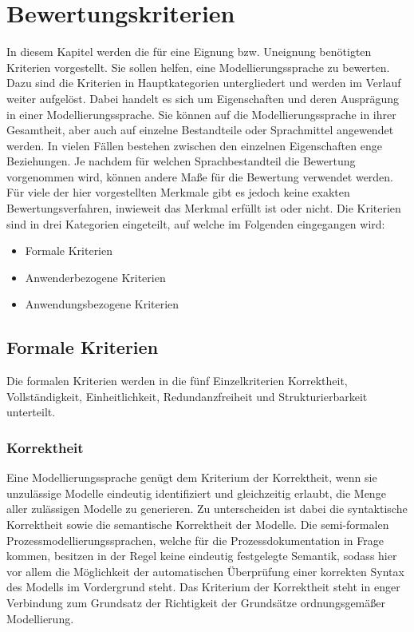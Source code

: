 

\chapter{Bewertungskriterien}
In diesem Kapitel werden die für eine Eignung bzw. Uneignung benötigten Kriterien vorgestellt.
Sie sollen helfen, eine Modellierungssprache zu bewerten. Dazu sind die Kriterien in Hauptkategorien untergliedert und werden im Verlauf weiter aufgelöst. 
Dabei handelt es sich um Eigenschaften und deren Ausprägung in einer Modellierungssprache.
Sie können auf die Modellierungssprache in ihrer Gesamtheit, aber auch auf einzelne Bestandteile oder Sprachmittel angewendet werden.
In vielen Fällen bestehen zwischen den einzelnen Eigenschaften enge Beziehungen.
Je nachdem für welchen Sprachbestandteil die Bewertung vorgenommen wird, können andere Maße für die Bewertung verwendet werden.
Für viele der hier vorgestellten Merkmale gibt es jedoch keine exakten Bewertungsverfahren, inwieweit das Merkmal erfüllt ist oder nicht.
Die Kriterien sind in drei Kategorien eingeteilt, auf welche im Folgenden eingegangen wird:

\begin{itemize}
		\item Formale Kriterien
		\item Anwenderbezogene Kriterien
		\item Anwendungsbezogene Kriterien
\end{itemize}

\section{Formale Kriterien}  
Die formalen Kriterien werden in die fünf Einzelkriterien Korrektheit, Vollständigkeit, Einheitlichkeit, Redundanzfreiheit und Strukturierbarkeit unterteilt.
\subsection{Korrektheit}
Eine Modellierungssprache genügt dem Kriterium der Korrektheit, wenn sie unzulässige Modelle eindeutig identifiziert und gleichzeitig erlaubt, die Menge aller zulässigen Modelle zu generieren. Zu unterscheiden ist dabei die syntaktische Korrektheit sowie die semantische Korrektheit der Modelle. Die semi-formalen Prozessmodellierungssprachen, welche für die Prozessdokumentation in Frage kommen, besitzen in der Regel keine eindeutig festgelegte Semantik, sodass hier vor allem die Möglichkeit der automatischen Überprüfung einer korrekten Syntax des Modells im Vordergrund steht. Das Kriterium der Korrektheit steht in enger Verbindung zum Grundsatz der Richtigkeit der Grundsätze ordnungsgemäßer Modellierung.
